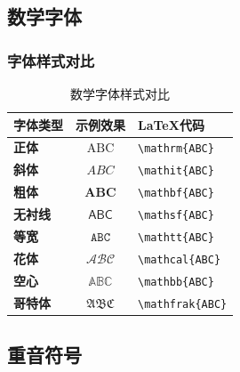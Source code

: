 \documentclass{article}
\begin{document}
\subsection{数学字体}

\subsubsection{字体样式对比}
\begin{table}[H]
    \centering
    \begin{tabular}{>{\bfseries}l|c|>{\ttfamily}l}
        \hline
        \textbf{字体类型} & \textbf{示例效果}    & \textbf{LaTeX代码}      \\
        \hline
        正体            & $\mathrm{ABC}$   & \verb|\mathrm{ABC}|   \\
        斜体            & $\mathit{ABC}$   & \verb|\mathit{ABC}|   \\
        粗体            & $\mathbf{ABC}$   & \verb|\mathbf{ABC}|   \\
        无衬线           & $\mathsf{ABC}$   & \verb|\mathsf{ABC}|   \\
        等宽            & $\mathtt{ABC}$   & \verb|\mathtt{ABC}|   \\
        花体            & $\mathcal{ABC}$  & \verb|\mathcal{ABC}|  \\
        空心            & $\mathbb{ABC}$   & \verb|\mathbb{ABC}|   \\
        哥特体           & $\mathfrak{ABC}$ & \verb|\mathfrak{ABC}| \\
        \hline
    \end{tabular}
    \caption{数学字体样式对比}
\end{table}

\subsection{重音符号}
\end{document}
